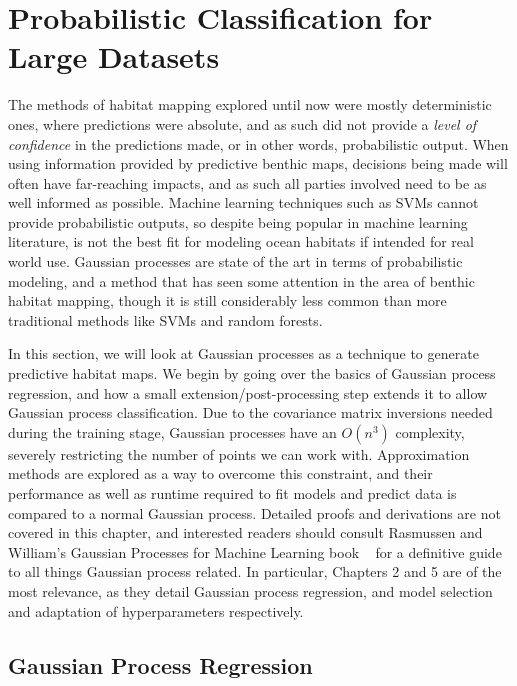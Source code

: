 \chapter{Probabilistic Classification for Large Datasets}\label{chap:gps}

The methods of habitat mapping explored until now were mostly deterministic ones, where predictions were absolute, and as such did not provide a \textit{level of confidence} in the predictions made, or in other words, probabilistic output. When using information provided by predictive benthic maps, decisions being made will often have far-reaching impacts, and as such all parties involved need to be as well informed as possible. Machine learning techniques such as SVMs cannot provide probabilistic outputs, so despite being popular in machine learning literature, is not the best fit for modeling ocean habitats if intended for real world use. Gaussian processes are state of the art in terms of probabilistic modeling, and a method that has seen some attention in the area of benthic habitat mapping, though it is still considerably less common than more traditional methods like SVMs and random forests.

In this section, we will look at Gaussian processes as a technique to generate predictive habitat maps. We begin by going over the basics of Gaussian process regression, and how a small extension/post-processing step extends it to allow Gaussian process classification. Due to the covariance matrix inversions needed during the training stage, Gaussian processes have an $O(n^3)$ complexity, severely restricting the number of points we can work with. Approximation methods are explored as a way to overcome this constraint, and their performance as well as runtime required to fit models and predict data is compared to a normal Gaussian process. Detailed proofs and derivations are not covered in this chapter, and interested readers should consult Rasmussen and William's Gaussian Processes for Machine Learning book ~\citep{rasmussen06} for a definitive guide to all things Gaussian process related. In particular, Chapters 2 and 5 are of the most relevance, as they detail Gaussian process regression, and model selection and adaptation of hyperparameters respectively.

 \section{Gaussian Process Regression}\label{chapsec:gpr}

